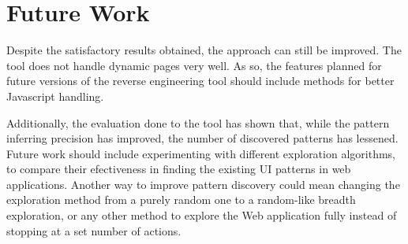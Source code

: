 \section{Future Work}
Despite the satisfactory results obtained, the approach can still be improved. The tool does not handle dynamic pages very well. As so, the features planned for future versions of the reverse engineering tool should include methods for better Javascript handling. 

Additionally, the evaluation done to the tool has shown that, while the pattern inferring precision has improved, the number of discovered patterns has lessened. Future work should include experimenting with different exploration algorithms, to compare their efectiveness in finding the existing UI patterns in web applications. Another way to improve pattern discovery could mean changing the exploration method from a purely random one to a random-like breadth exploration, or any other method to explore the Web application fully instead of stopping at a set number of actions.


